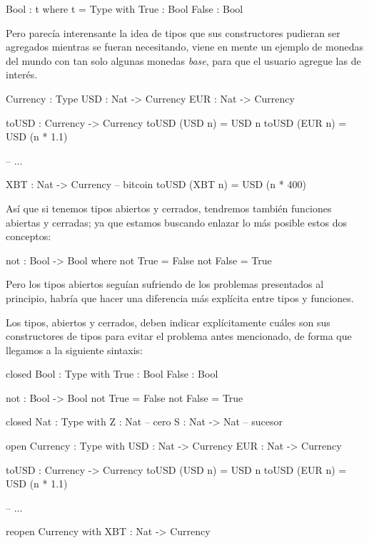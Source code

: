 {\begin{designfr}
\begin{anglercode}
Bool : t where t = Type
    with
        True : Bool
        False : Bool
\end{anglercode}

Pero parecía interensante la idea de tipos que sus constructores pudieran ser agregados mientras se fueran necesitando, viene en mente un ejemplo de monedas del mundo con tan solo algunas monedas \textit{base}, para que el usuario agregue las de interés.

\begin{anglercode}
Currency : Type
USD : Nat -> Currency
EUR : Nat -> Currency

toUSD : Currency -> Currency
toUSD (USD n) = USD n
toUSD (EUR n) = USD (n * 1.1)

-- ...

XBT : Nat -> Currency   -- bitcoin
toUSD (XBT n) = USD (n * 400)
\end{anglercode}

Así que si tenemos tipos abiertos y cerrados, tendremos también funciones abiertas y cerradas; ya que estamos buscando enlazar lo más posible estos dos conceptos:

\begin{anglercode}
not : Bool -> Bool where
    not True = False
    not False = True
\end{anglercode}

Pero los tipos abiertos seguían sufriendo de los problemas presentados al principio, habría que hacer una diferencia más explícita entre tipos y funciones.

Los tipos, abiertos y cerrados, deben indicar explícitamente cuáles son sus constructores de tipos para evitar el problema antes mencionado, de forma que llegamos a la siguiente sintaxis:

\begin{anglercode}
closed Bool : Type with
    True : Bool
    False : Bool

not : Bool -> Bool
not True = False
not False = True

closed Nat : Type with
    Z : Nat             -- cero
    S : Nat -> Nat      -- sucesor

open Currency : Type with
    USD : Nat -> Currency
    EUR : Nat -> Currency

toUSD : Currency -> Currency
toUSD (USD n) = USD n
toUSD (EUR n) = USD (n * 1.1)

-- ...

reopen Currency with
    XBT : Nat -> Currency


\end{anglercode}
\end{designfr}}
